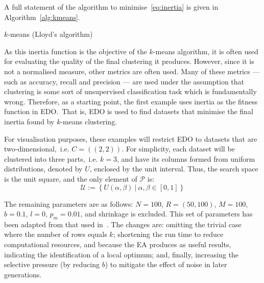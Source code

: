 A full statement of the algorithm to minimise~\eqref{eq:inertia} is given in
Algorithm~\ref{alg:kmeans}.

\balg%

\caption{\(k\)-means (Lloyd's algorithm)}\label{alg:kmeans}
\ealg%

As this inertia function is the objective of the \(k\)-means algorithm, it is
often used for evaluating the quality of the final clustering it produces.
However, since it is not a normalised measure, other metrics are often used.
Many of these metrics --- such as accuracy, recall and precision --- are used
under the assumption that clustering is some sort of unsupervised classification
task which is fundamentally wrong. Therefore, as a starting point, the first
example uses inertia as the fitness function in EDO.\ That is, EDO is used to
find datasets that minimise the final inertia found by \(k\)-means clustering.


For visualisation purposes, these examples will restrict EDO to datasets that
are two-dimensional,~i.e. \(C = ((2, 2))\). For simplicity, each dataset
will be clustered into three parts,~i.e. \(k = 3\), and have its columns formed
from uniform distributions, denoted by \(U\), enclosed by the unit interval.
Thus, the search space is the unit square, and the only element of
\(\mathcal{P}\) is:
\begin{equation}\label{eq:uniform}
    \mathcal{U} := \left\{U(\alpha, \beta)~|~\alpha, \beta \in [0, 1]\right\}
\end{equation}


The remaining parameters are as follows: \(N=100\), \(R=(50,100)\), \(M=100\),
\(b=0.1\), \(l=0\), \(p_m=0.01\), and shrinkage is excluded. This set of
parameters has been adapted from that used in~\cite{Wilde2020:edo}. The changes
are: omitting the trivial case where the number of rows equals \(k\); shortening
the run time to reduce computational resources, and because the EA produces as
useful results, indicating the identification of a local optimum; and, finally,
increasing the selective pressure (by reducing \(b\)) to mitigate the effect of
noise in later generations.

